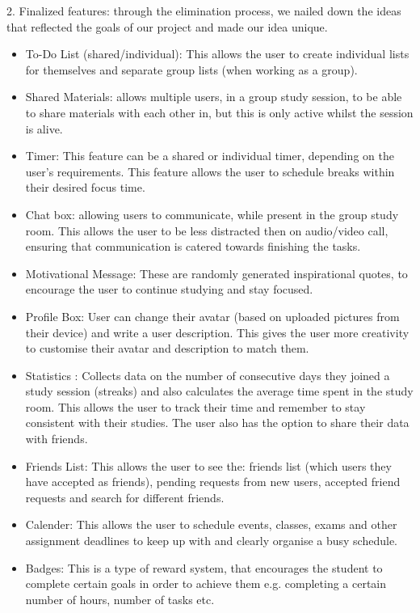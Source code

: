 2. Finalized features: through the elimination process, we nailed down the ideas that reflected the goals of our project and made our idea unique.
\begin{itemize}
    \item To-Do List (shared/individual): This allows the user to create individual lists for themselves and separate group lists (when working as a group).
    \item Shared Materials: allows multiple users, in a group study session, to be able to share materials with each other in, but this is only active whilst the session is alive.
    \item Timer: This feature can be a shared or individual timer, depending on the user’s requirements. This feature allows the user to schedule breaks within their desired focus time.
    \item Chat box: allowing users to communicate, while present in the group study room. This allows the user to be less distracted then on audio/video call, ensuring that communication is catered towards finishing the tasks.
    \item Motivational Message: These are randomly generated inspirational quotes, to encourage the user to continue studying and stay focused.
    \item Profile Box:  User can change their avatar (based on uploaded pictures from their device) and write a user description. This gives the user more creativity to customise their avatar and description to match them.
    \item Statistics : Collects data on the number of consecutive days they joined a study session (streaks) and also calculates the average time spent in the study room. This allows the user to track their time and remember to stay consistent with their studies. The user also has the option to share their data with friends.
    \item Friends List: This allows the user to see the: friends list (which users they have accepted as friends), pending requests from new users, accepted friend requests and search for different friends.
    \item Calender: This allows the user to schedule events, classes, exams and other assignment deadlines to keep up with and clearly organise a busy schedule.
    \item Badges: This is a type of reward system, that encourages the student to complete certain goals in order to achieve them e.g. completing a certain number of hours, number of tasks etc.

\end{itemize}
